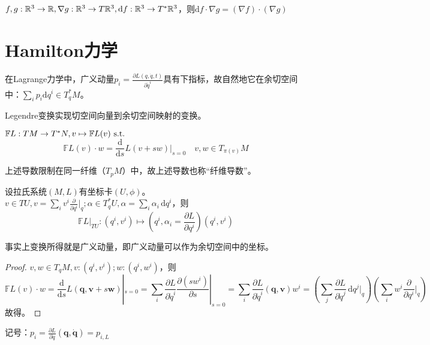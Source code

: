 \documentclass{ctexbook}
\begin{document}
\begin{Eg}
  $f,g:\mathbb{R}^3\to\mathbb{R}, \nabla g:\mathbb{R}^3\to T\mathbb{R}^3, \mathrm{d}f: \mathbb{R}^3\to T^{*}\mathbb{R}^{3}$，则$\mathrm{d}f\cdot \nabla g=(\nabla f)\cdot (\nabla g)$
\end{Eg}

\section{Hamilton力学}
在Lagrange力学中，广义动量$p_i=\frac{\partial L(q,\dot{q},t)}{\partial \dot{q}^{i}}$具有下指标，故自然地它在余切空间中：$\sum\limits_i^{}p_i \mathrm{d}q^i \in T^{*}_qM$。

Legendre变换实现切空间向量到余切空间映射的变换。

\begin{Def}[Legendre变换]
  $\mathbb{F}L:TM\to T^{*}N, v\mapsto \mathbb{F}L(v)\text{ s.t. }$
  \begin{equation*}
\mathbb{F}L(v)\cdot w= \frac{\mathrm{d}}{\mathrm{d}s}L(v+sw)|_{s=0} \quad v,w\in T_{\pi(v)}M
  \end{equation*} 
\end{Def}
上述导数限制在同一纤维（$T_{p}M$）中，故上述导数也称“纤维导数”。

\begin{Prop}
  设拉氏系统$(M,L)$有坐标卡$(U,\phi)$。$v\in TU, v=\sum\limits_i^{} v^i \frac{\partial }{\partial q^{i}}|_q; \alpha\in T_q^{*} U, \alpha=\sum\limits_i^{}\alpha_i \,\mathrm{d} q^i$，则
  \[\mathbb{F}L|_{TU}: (q^i, v^i) \mapsto (q^i, \alpha_i= \frac{\partial L}{\partial q^{i}})(q^i,v^i)\]
\end{Prop}

事实上变换所得就是广义动量，即广义动量可以作为余切空间中的坐标。

\begin{proof}
  $v,w\in T_qM, v:(q^i,v^i); w: (q^i, w^i)$，则
  \[\mathbb{F}L(v)\cdot w =\frac{\mathrm{d}}{\mathrm{d}s}L(\bm{q}, \bm{v}+s\bm{w})|_{s=0}=\sum\limits_i^{}\frac{\partial L}{\partial \dot{q}^{i}}\frac{\partial (sw^{i})}{\partial s}|_{s=0}=\sum\limits_i^{} \frac{\partial L}{\partial \dot{q}^{i}}(\bm{q},\bm{v})w^i=(\sum\limits_j^{}\frac{\partial L}{\partial \dot{q}^{j}}\,\mathrm{d}q^j|_q)(\sum\limits_{i}^{}w^i \frac{\partial }{\partial q^{i}}|_{q})\]
  故得。
\end{proof}

记号：$p_i=\frac{\partial L}{\partial \dot{q}}(\bm{q}, \bm{\dot{q}})= p_{i,L}$

\end{document}
